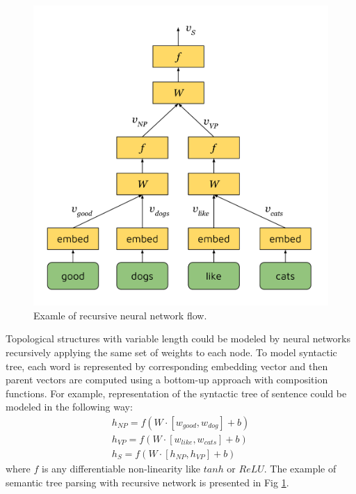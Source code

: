 \begin{figure}[h]
\centering
\includegraphics{Figures/rvnn}
\decoRule
\caption[RvNN flow]{Examle of recursive neural network flow.}
\label{fig:rvnn}
\end{figure}

Topological structures with variable length could be modeled by neural networks recursively applying the same set of weights to each node. To model syntactic tree, each word is represented by corresponding embedding vector and then parent vectors are computed using a bottom-up approach with composition functions. For example, representation of the syntactic tree of sentence  could be modeled in the following way:
\begin{equation}
\begin{split}
h_{NP} = f(W\cdot[w_{good}, w_{dog}] + b)\\
h_{VP} = f(W\cdot[w_{like}, w_{cats}] + b)\\
h_S = f(W\cdot[h_{NP}, h_{VP}] + b)
\label{rvnn:example}
\end{split}
\end{equation}
where $f$ is any differentiable non-linearity like $tanh$ or $ReLU$. The example of semantic tree parsing with recursive network is presented in Fig \ref{fig:rvnn}.

